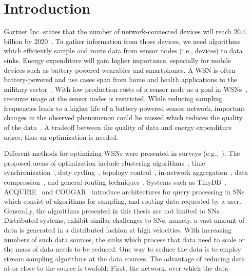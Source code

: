 \section{Introduction}
\label{sec:Introduction}
Gartner Inc. states that the number of network-connected devices will reach
20.4 billion by 2020~\cite{gartner}. To gather information from those devices,
we need algorithms which efficiently sample and route data from sensor nodes
(i.e., devices) to data sinks. Energy expenditure will gain higher importance,
especially for mobile devices such as battery-powered wearables and
smartphones. A \ac{WSN} is often battery-powered and use cases span from home
and health applications to the military sector~\cite{akyildiz2002wireless}.
With low production costs of a sensor node as a goal in
\acp{WSN}~\cite{akyildiz2002wireless}, resource usage at the sensor nodes is
restricted. While reducing sampling frequencies leads to a higher life of a
battery-powered sensor network, important changes in the observed phenomenon
could be missed which reduces the quality of the
data~\cite{akyildiz2002wireless}. A tradeoff between the quality of data and
energy expenditure arises; thus an optimization is needed. 
\par
Different methods for optimizing \acp{WSN} were presented in surveys
(e.g.,~\cite{abbasi2007survey, sivrikaya2004time, carrano2014survey}). The
proposed areas of optimization include clustering
algorithms~\cite{abbasi2007survey}, time
synchronization~\cite{sivrikaya2004time}, duty
cycling~\cite{carrano2014survey}, topology control~\cite{li2013survey},
in-network aggregation~\cite{fasolo2007network}, data
compression~\cite{srisooksai2012practical}, and general routing
techniques~\cite{al2004routing, kulkarni2011particle, singh2015survey,
rault2014energy}. Systems such as TinyDB~\cite{madden2005tinydb},
ACQUIRE~\cite{sadagopan2003acquire} and COUGAR~\cite{yao2002cougar} introduce
architectures for query processing in \acp{SN} which consist of algorithms for
sampling, and routing data requested by a user. Generally, the algorithms
presented in this thesis are not limited to \acp{SN}. Distributed systems,
exhibit similar challenges to \acp{SN}, namely, a vast amount of data is
generated in a distributed fashion at high velocities. With increasing numbers
of such data sources, the sinks which process that data need to scale or the
mass of data needs to be reduced. One way to reduce the data is to employ
stream sampling algorithms at the data sources. The advantage of reducing data
at or close to the source is twofold: First, the network, over which the data

